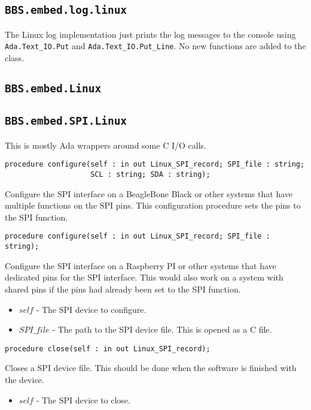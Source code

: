 \documentclass[10pt, openany]{book}
\newcommand{\indexfunc}[1]{\index[func]{#1}}
\newcommand{\package}[1]{\texttt{#1}}
\newcommand{\function}[1]{\texttt{#1}}
\newcommand{\comment}[1]{{\color{red}{#1}}}
\begin{document}
\subsection{\package{BBS.embed.log.linux}}
The Linux log implementation just prints the log messages to the console using \function{Ada.Text\_IO.Put} and \function{Ada.Text\_IO.Put\_Line}.  No new functions are added to the class.

\subsection{\package{BBS.embed.Linux}}

\subsection{\package{BBS.embed.SPI.Linux}}
This is mostly Ada wrappers around some C I/O calls.

\begin{lstlisting}
procedure configure(self : in out Linux_SPI_record; SPI_file : string;
                    SCL : string; SDA : string);
\end{lstlisting}
\indexfunc{configure}
Configure the SPI interface on a BeagleBone Black or other systems that have multiple functions on the SPI pins.  This configuration procedure sets the pins to the SPI function.

\comment{This function is not yet implemented.  Do not attempt to use.}
\begin{lstlisting}
procedure configure(self : in out Linux_SPI_record; SPI_file : string);
\end{lstlisting}
\indexfunc{configure}
Configure the SPI interface on a Raspberry PI or other systems that have dedicated pins for the SPI interface.  This would also work on a system with shared pins if the pins had already been set to the SPI function.
\begin{itemize}
  \item $self$ - The SPI device to configure.
  \item $SPI\_file$ - The path to the SPI device file.  This is opened as a C file.
\end{itemize}

\begin{lstlisting}
procedure close(self : in out Linux_SPI_record);
\end{lstlisting}
\indexfunc{close}
Closes a SPI device file.  This should be done when the software is finished with the device.
\begin{itemize}
  \item $self$ - The SPI device to close.
\end{itemize}
\end{document}
